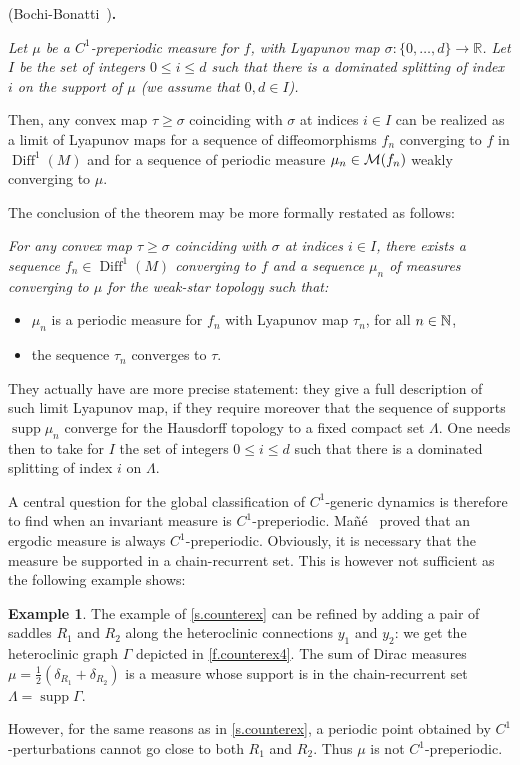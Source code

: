 \documentclass[11pt, a4paper]{amsart}
\theoremstyle{plain}
\theoremstyle{definition}
\newtheorem{example}{Example}[proposition]
\theoremstyle{remark}
\numberwithin{equation}{section}         %
\DeclareMathOperator{\Diff}{{Diff}}
\DeclareMathOperator*{\supp}{supp}
\def\Diff{\operatorname{Diff}}
\begin{document}
 (Bochi-Bonatti~\cite[Theorem~3]{BB}){\bf .}
{\em Let $\mu$ be a $C^1$-preperiodic measure for $f$, with Lyapunov map $\sigma\colon \{0,\ldots,d\}\to \mathbb{R}$. Let $I$ be the set of integers $0\leq i\leq d$ such that there is a dominated splitting of index $i$ on the support of $\mu$ (we assume that $0,d\in I$). 

Then, any convex map $\tau\geq \sigma$ coinciding with $\sigma$ at indices $i\in I$ can be realized as a limit of Lyapunov maps for a sequence of diffeomorphisms $f_n$ converging to $f$ in $\Diff^1(M)$ and for a sequence of periodic measure $\mu_n\in {\mathcal M}(f_n)$  weakly converging to  $\mu$.}
\medskip

\noindent The conclusion of the theorem may be more formally restated as follows: 
{\em For any convex map $\tau\geq \sigma$ coinciding with $\sigma$ at indices $i\in I$, there exists a sequence $f_n\in \Diff^1(M)$ converging to $f$ and a sequence $\mu_n$ of measures converging to $\mu$ for the weak-star topology such that:
\begin{itemize}
\item $\mu_n$ is a periodic measure for $f_n$ with Lyapunov map $\tau_n$, for all $n\in {\mathbb N}$,
\item the sequence $\tau_n$ converges to $\tau$.
\end{itemize}}
\medskip

They actually have are more precise statement: they give a full description of such limit Lyapunov map, if they require moreover that the sequence of supports $\supp \mu_n$ converge for the Hausdorff topology to a fixed compact set $\Lambda$. One needs then to take for $I$ the set of integers $0\leq i\leq d$ such that there is a dominated splitting of index $i$ on $\Lambda$.

A central question for the global classification of $C^1$-generic dynamics is therefore to find when an invariant measure is $C^1$-preperiodic. Ma\~n\'e~\cite{M} proved that an ergodic measure is always $C^1$-preperiodic. 
Obviously, it is necessary that the measure be supported in a chain-recurrent set. This is however not sufficient as the following example shows: 

\begin{example}
The example of \cref{s.counterex} can be refined by adding a pair of saddles $R_1$ and $R_2$ along the heteroclinic connections $y_1$ and $y_2$: we get the heteroclinic graph $\Gamma$ depicted in \cref{f.counterex4}.  The sum of Dirac measures $\mu=\frac{1}{2}(\delta_{R_1}+\delta_{R_2})$ is a measure whose support is in the chain-recurrent set $\Lambda=\supp \Gamma$. 

However, for the same reasons as in  \cref{s.counterex}, a periodic point obtained by $C^1$-perturbations cannot go close to both $R_1$ and $R_2$. Thus $\mu$ is not $C^1$-preperiodic.
\end{example}
\end{document}
